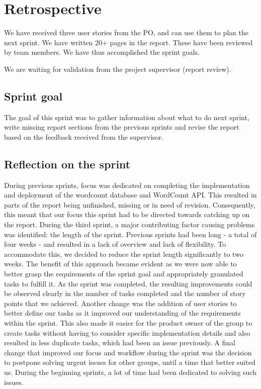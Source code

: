 \section{Retrospective}
We have received three user stories from the PO, and can use them to plan the next sprint.  We have written 20+ pages in the report. These have been reviewed by team members.  We have thus accomplished the sprint goals. 

We are waiting for validation from the project supervisor (report review).

\subsection{Sprint goal}
The goal of this sprint was to gather information about what to do next sprint, write missing report sections from the previous sprints and revise the report based on the feedback received from the supervisor. 

\subsection{Reflection on the sprint}
During previous sprints, focus was dedicated on completing the implementation and deployment of the wordcount database and WordCount API. This resulted in parts of the report being unfinished, missing or in need of revision. Consequently, this meant that our focus this sprint had to be directed towards catching up on the report.
During the third sprint, a major contributing factor causing problems was identified: the length of the sprint. Previous sprints had been long - a total of four weeks - and resulted in a lack of overview and lack of flexibility. To accommodate this, we decided to reduce the sprint length significantly to two weeks. The benefit of this approach became evident as we were now able to better grasp the requirements of the sprint goal and appropriately granulated tasks to fulfill it. As the sprint was completed, the resulting improvements could be observed clearly in the number of tasks completed and the number of story points that we achieved. 
Another change was the addition of user stories to better define our tasks as it improved our understanding of the requirements within the sprint. This also made it easier for the product owner of the group to create tasks without having to consider specific implementation details and also resulted in less duplicate tasks, which had been an issue previously.
A final change that improved our focus and workflow during the sprint was the decision to postpone solving urgent issues for other groups, until a time that better suited us. During the beginning sprints, a lot of time had been dedicated to solving such issues.

